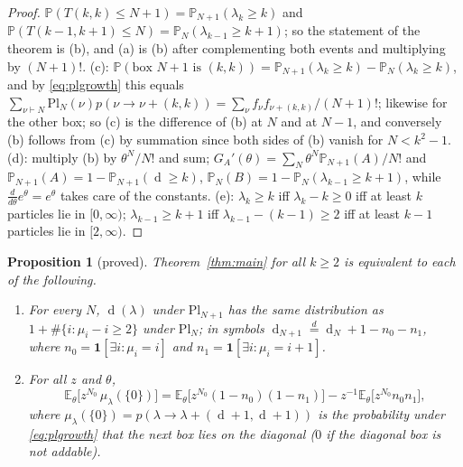 \documentclass[11pt]{article}
\newtheorem{proposition}[theorem]{Proposition}
\theoremstyle{definition}
\theoremstyle{remark}
\newcommand{\E}{\mathbb{E}}
\newcommand{\Prob}{\mathbb{P}}
\newcommand{\Pl}{\mathrm{Pl}}
\DeclareMathOperator{\Durfee}{d}
\begin{document}
\begin{proof}
$\Prob(T(k,k)\le N+1)=\Prob_{N+1}(\lambda_k\ge k)$ and $\Prob(T(k-1,k+1)\le N)=\Prob_N(\lambda_{k-1}\ge k+1)$; so the statement of the theorem is (b), and (a) is (b) after complementing both events and multiplying by $(N+1)!$. (c): $\Prob(\text{box }N+1\text{ is }(k,k))=\Prob_{N+1}(\lambda_k\ge k)-\Prob_N(\lambda_k\ge k)$, and by \eqref{eq:plgrowth} this equals $\sum_{\nu\vdash N}\Pl_N(\nu)p(\nu\to\nu+(k,k))=\sum_\nu f_\nu f_{\nu+(k,k)}/(N+1)!$; likewise for the other box; so (c) is the difference of (b) at $N$ and at $N-1$, and conversely (b) follows from (c) by summation since both sides of (b) vanish for $N<k^2-1$. (d): multiply (b) by $\theta^N/N!$ and sum; $G_A'(\theta)=\sum_N\theta^N\Prob_{N+1}(A)/N!$ and $\Prob_{N+1}(A)=1-\Prob_{N+1}(\Durfee\ge k)$, $\Prob_N(B)=1-\Prob_N(\lambda_{k-1}\ge k+1)$, while $\frac{d}{d\theta}e^\theta=e^\theta$ takes care of the constants. (e): $\lambda_k\ge k$ iff $\lambda_k-k\ge0$ iff at least $k$ particles lie in $[0,\infty)$; $\lambda_{k-1}\ge k+1$ iff $\lambda_{k-1}-(k-1)\ge2$ iff at least $k-1$ particles lie in $[2,\infty)$.
\end{proof}

\begin{proposition}[proved]\label{prop:cleanform}
Theorem~\ref{thm:main} for all $k\ge2$ is equivalent to each of the following.
\begin{enumerate}[label=(\alph*)]
\item For every $N$, $\Durfee(\lambda)$ under $\Pl_{N+1}$ has the same distribution as $1+\#\{i:\mu_i-i\ge2\}$ under $\Pl_N$; in symbols $\Durfee_{N+1}\overset{d}{=}\Durfee_N+1-n_0-n_1$, where $n_0=\mathbf 1[\exists i:\mu_i=i]$ and $n_1=\mathbf 1[\exists i:\mu_i=i+1]$.
\item For all $z$ and $\theta$,
\begin{equation}\label{eq:starstar}
\E_\theta\bigl[z^{N_0}\,\mu_\lambda(\{0\})\bigr]=\E_\theta\bigl[z^{N_0}(1-n_0)(1-n_1)\bigr]-z^{-1}\E_\theta\bigl[z^{N_0}n_0n_1\bigr],
\end{equation}
where $\mu_\lambda(\{0\})=p(\lambda\to\lambda+(\Durfee+1,\Durfee+1))$ is the probability under \eqref{eq:plgrowth} that the next box lies on the diagonal ($0$ if the diagonal box is not addable).
\end{enumerate}
\end{proposition}
\end{document}
